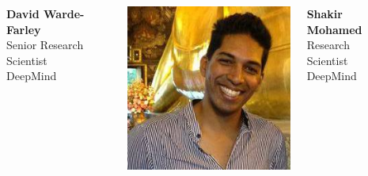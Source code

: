 \documentclass[compress]{beamer}
\begin{document}
\begin{frame}
\begin{columns}
\begin{column}{.3\textwidth}
    \end{column}
    \begin{column}{.2\textwidth}
        \tiny
        \textbf{David Warde-Farley} \\
        Senior Research Scientist \\
        DeepMind \\
    \end{column}
    \begin{column}{.3\textwidth}
        \includegraphics[width=\textwidth]{auth4} 
    \end{column}
    \begin{column}{.2\textwidth}
        \tiny
        \textbf{Shakir Mohamed} \\
        Research Scientist \\
        DeepMind \\
    \end{column}
\end{columns}

\end{frame}
\end{document}
